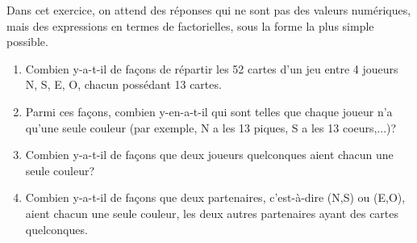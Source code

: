 \documentclass[../PolyS4.tex]{subfiles}
\begin{document}











Dans cet exercice, on attend des réponses qui ne sont pas des valeurs numériques, mais des expressions en termes de factorielles, sous la forme
la plus simple possible.
\begin{enumerate}
 \item Combien y-a-t-il de façons de répartir les 52 cartes d'un jeu entre 4 joueurs N, S, E, O, chacun possédant 13 cartes.
 \item Parmi ces façons, combien y-en-a-t-il qui sont telles que chaque joueur n'a qu'une seule couleur (par exemple, N a les 13 piques, S a les 13 coeurs,...)?
 \item Combien y-a-t-il de façons que deux joueurs quelconques aient chacun une seule couleur?
 \item Combien y-a-t-il de façons que deux partenaires, c'est-à-dire (N,S) ou (E,O), aient chacun une seule couleur, les deux autres partenaires ayant des cartes quelconques.\\
\end{enumerate}
\end{document}
